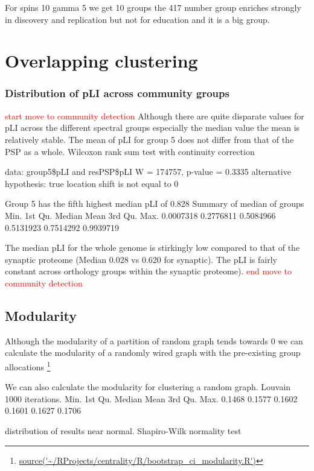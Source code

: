 For spins 10 gamma 5 we get 10 groups the 417 number group enriches strongly in discovery and replication but not for education and it is a big group.


\section{Overlapping clustering}


\subsubsection{Distribution of pLI across community groups}
\textcolor{red}{start move to community detection}
Although there are quite disparate values for pLI across the different spectral groups especially the median value the mean is relatively stable. The mean of pLI for group 5 does not differ from that of the PSP as a whole.         Wilcoxon rank sum test with continuity correction

data:  group5\$pLI and resPSP\$pLI
W = 174757, p-value = 0.3335
alternative hypothesis: true location shift is not equal to 0

Group 5 has the fifth highest median pLI of 0.828
Summary of median of groups
    Min.   1st Qu.    Median      Mean   3rd Qu.      Max. 
0.0007318 0.2776811 0.5084966 0.5131923 0.7514292 0.9939719 

The median pLI for the whole genome is stirkingly low compared to that of the synaptic proteome (Median 0.028 vs 0.620 for synaptic). The pLI is fairly constant across orthology groups within the synaptic proteome).
\textcolor{red}{end move to community detection}
\subsection{Modularity}

Although the modularity of a partition of random graph tends towards 0 we can calculate the modularity of a randomly wired graph with the pre-existing group allocations \footnote{\url{source('~/RProjects/centrality/R/bootstrap_ci_modularity.R')}}

We can also calculate the modularity for clustering a random graph. Louvain 1000 iterations.
  Min. 1st Qu.  Median    Mean 3rd Qu.    Max. 
 0.1468  0.1577  0.1602  0.1601  0.1627  0.1706 
 
 distribution of results near normal. 	Shapiro-Wilk normality test

